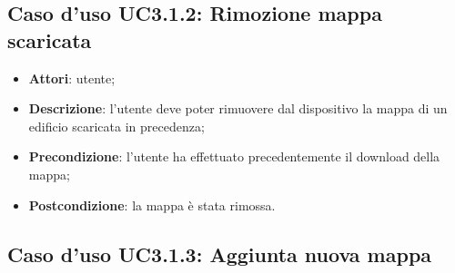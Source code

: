 \documentclass[../AnalisiDeiRequisiti.tex]{subfiles}
\begin{document}
\subsection{Caso d'uso UC3.1.2: Rimozione mappa scaricata}
\begin{itemize}
\item \textbf{Attori}: utente;
\item \textbf{Descrizione}: l'utente deve poter rimuovere dal dispositivo la mappa di un edificio scaricata in precedenza; 
      \item \textbf{Precondizione}: l'utente ha effettuato precedentemente il download della mappa;
    \item \textbf{Postcondizione}: la mappa è stata rimossa.
  \end{itemize}
\newpage
\hypertarget{UC3.1.3}{}
\subsection{Caso d'uso UC3.1.3: Aggiunta nuova mappa}
\end{document}
